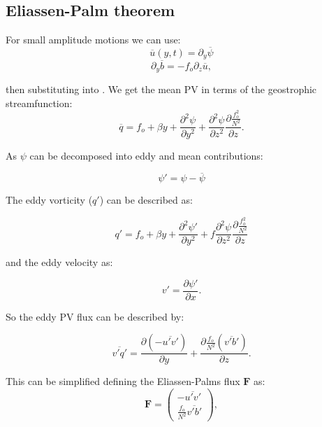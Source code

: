 \subsection{Eliassen-Palm theorem}

For small amplitude motions we can use:
\begin{equation}
\overline{u}(y,t)=\partial _y \overline{\psi}
\end{equation}
\begin{equation}
\partial _y \overline{b} = -f_o \partial _z \overline{u},
\end{equation}

then substituting into . We get the mean PV in terms of the geostrophic streamfunction:
\begin{equation}
\overline{q}=f_o + \beta y + \frac{\partial^2 \psi}{\partial y^2}+\frac{\partial^2 \psi}{\partial z^2}\frac{\partial \frac{f^2_o}{N^2}}{\partial z}.
\end{equation}

As $\psi$ can be decomposed into eddy and mean contributions:

\begin{equation*}
\psi '=\psi - \overline{\psi}
\end{equation*}

The eddy vorticity ($q'$) can be described as:

\begin{equation}
q'=f_o + \beta y + \frac{\partial^2 \psi '}{\partial y^2}+f \frac{\partial^2 \psi}{\partial z^2}\frac{\partial \frac{f^2_o}{N^2}}{\partial z}
\end{equation}

and the eddy velocity as:

\begin{equation}
v'=\frac{\partial \psi '}{\partial x} .
\end{equation}

So the eddy PV flux can be described by:

\begin{equation}
\overline{v'q'}= \frac{\partial (-\overline{u'v'})}{\partial y} + \frac{\partial \frac{f_o}{N^2}(\overline{v'b'})}{\partial z} .
\end{equation}

This can be simplified defining the Eliassen-Palms flux $\textbf{F}$ as:
\begin{equation}
\textbf{F}= \begin{pmatrix}
            -\overline{u'v'} \\ \frac{f_o}{N^2}\overline{v'b'}
            \end{pmatrix},
\end{equation}

